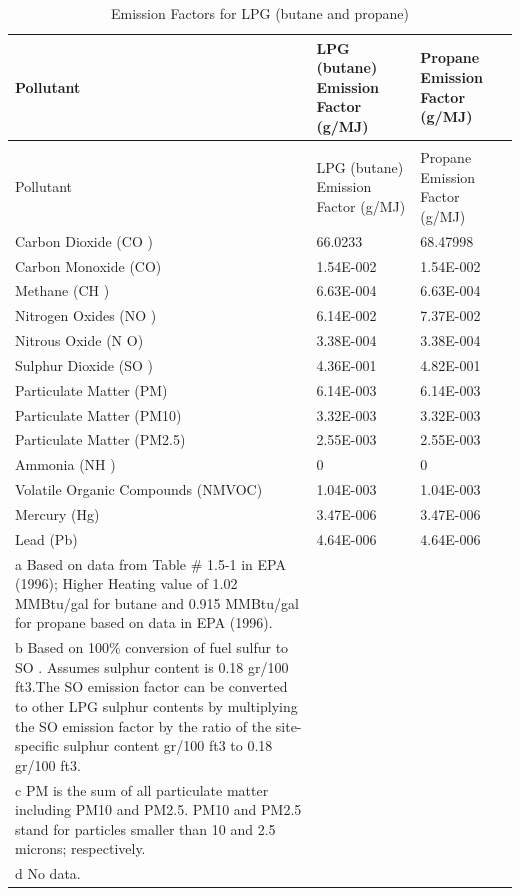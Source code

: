 \begin{longtable}[c]{p{3.0in}p{1.5in}p{1.5in}}
\caption{Emission Factors for LPG (butane and propane) \label{table:emission-factors-for-lpg-butane-and-propane}} \tabularnewline
\toprule 
Pollutant & LPG (butane) Emission Factor    (g/MJ) & Propane Emission Factor    (g/MJ) \tabularnewline
\midrule
\endfirsthead

\caption[]{Emission Factors for LPG (butane and propane)} \tabularnewline
\toprule 
Pollutant & LPG (butane) Emission Factor    (g/MJ) & Propane Emission Factor    (g/MJ) \tabularnewline
\midrule
\endhead

Carbon Dioxide (CO  ) & 66.0233 & 68.47998 \tabularnewline
Carbon Monoxide (CO) & 1.54E-002 & 1.54E-002 \tabularnewline
Methane (CH  ) & 6.63E-004 & 6.63E-004 \tabularnewline
Nitrogen Oxides (NO  ) & 6.14E-002 & 7.37E-002 \tabularnewline
Nitrous Oxide (N  O) & 3.38E-004 & 3.38E-004 \tabularnewline
Sulphur Dioxide (SO  ) & 4.36E-001 & 4.82E-001 \tabularnewline
Particulate Matter (PM) & 6.14E-003 & 6.14E-003 \tabularnewline
Particulate Matter (PM10) & 3.32E-003 & 3.32E-003 \tabularnewline
Particulate Matter (PM2.5) & 2.55E-003 & 2.55E-003 \tabularnewline
Ammonia (NH  ) & 0 & 0 \tabularnewline
Volatile Organic Compounds (NMVOC) & 1.04E-003 & 1.04E-003 \tabularnewline
Mercury (Hg) & 3.47E-006 & 3.47E-006 \tabularnewline
Lead (Pb) & 4.64E-006 & 4.64E-006 \tabularnewline
a Based on data from Table \# 1.5-1 in EPA (1996); Higher Heating value of 1.02 MMBtu/gal for butane and 0.915 MMBtu/gal for propane based on data in EPA (1996). \tabularnewline
b Based on 100\% conversion of fuel sulfur to SO  . Assumes sulphur content is 0.18 gr/100 ft3.The SO   emission factor can be converted to other LPG sulphur contents by multiplying the SO   emission factor by the ratio of the site-specific sulphur content gr/100 ft3 to 0.18 gr/100 ft3. \tabularnewline
c PM is the sum of all particulate matter including PM10 and PM2.5. PM10 and PM2.5 stand for particles smaller than 10 and 2.5 microns; respectively. \tabularnewline
d No data. \tabularnewline
\bottomrule
\end{longtable}

